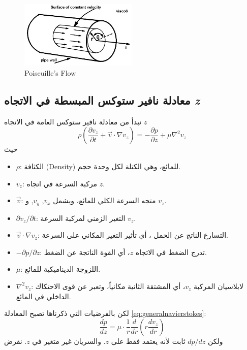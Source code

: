 \begin{english}
	\begin{figure}[ht]
		\centering
		\includegraphics[width=0.5\textwidth]{Figures/pe.jpg}
		\caption{Poiseuille's Flow}
	\end{figure}
\end{english}

\subsection*{معادلة نافير ستوكس المبسطة في الاتجاه \textit{z}}
نبدأ من معادلة نافير ستوكس العامة في الاتجاه $z$ 
\begin{equation}
	\label{eq:generalnavierstokes}
	\rho\left(
	\frac{\partial v_z}{\partial t} + \vec{v} \cdot \nabla v_z 
	\right)
	= - \frac{\partial p}{\partial z} + \mu \nabla^2 v_z
\end{equation}
حيث
\begin{itemize}
	\item $\rho$: الكثافة (Density) للمائع، وهي الكتلة لكل وحدة حجم.
	\item $v_z$: مركبة السرعة في اتجاه $z$.
	\item $\vec{v}$: متجه السرعة الكلي للمائع، ويشمل $v_x$, $v_y$, و $v_z$.
	\item ${\partial v_z}/{\partial t}$: التغير الزمني لمركبة السرعة $v_z$.
	\item $\vec{v} \cdot \nabla v_z$: التسارع الناتج عن الحمل ، أي تأثير التغير المكاني على السرعة.
	\item $-{\partial p}/{\partial z}$: تدرج الضغط في الاتجاه $z$، أي القوة الناتجة عن الضغط.
	\item $\mu$: اللزوجة الديناميكية  للمائع.
	\item $\nabla^2 v_z$: لابلاسيان المركبة $v_z$، أي المشتقة الثانية مكانياً، وتعبر عن قوى الاحتكاك الداخلي في المائع.
\end{itemize}
لكن بالفرضيات التي ذكرناها تصبح المعادلة \eqref{eq:generalnavierstokes}:
\[
\frac{dp }{dz} = \mu \cdot \frac{1}{r} \frac{d}{dr} \left(r \frac{dv_z}{dr}\right)
\]
ولكن $dp/dz$ ثابت لأنه يعتمد فقط على $z$. والسريان غير متغير في $z$. نفرض
